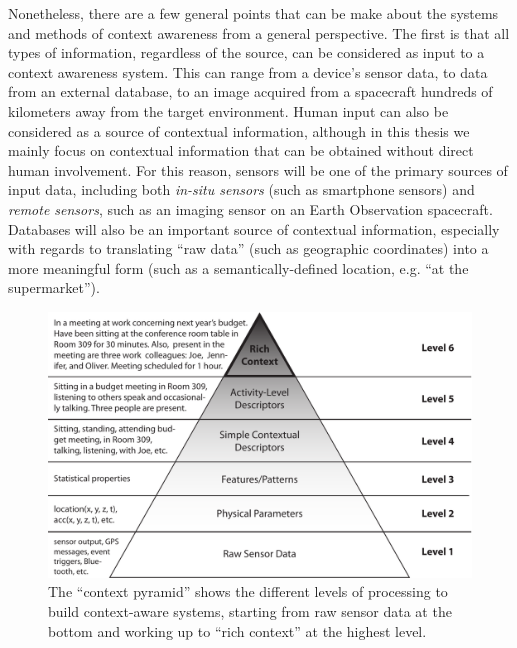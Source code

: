 Nonetheless, there are a few general points that can be make about the systems and methods of context awareness from a general perspective. The first is that all types of information, regardless of the source, can be considered as input to a context awareness system. This can range from a device's sensor data, to data from an external database, to an image acquired from a spacecraft hundreds of kilometers away from the target environment. Human input can also be considered as a source of contextual information, although in this thesis we mainly focus on contextual information that can be obtained without direct human involvement. For this reason, sensors will be one of the primary sources of input data, including both \emph{in-situ sensors} (such as smartphone sensors) and \emph{remote sensors}, such as an imaging sensor on an Earth Observation spacecraft. Databases will also be an important source of contextual information, especially with regards to translating ``raw data'' (such as geographic coordinates) into a more meaningful form (such as a semantically-defined location, e.g. ``at the supermarket'').
%
\begin{figure}[t]
  \begin{center}
    \includegraphics[width=1.0\textwidth]{Images/ContextPyramid4}
  \end{center}
  \caption[The Context Pyramid]{The ``context pyramid'' shows the different levels of processing to build context-aware systems, starting from raw sensor data at the bottom and working up to ``rich context'' at the highest level.}
  \label{fig:context_pyramid}
\end{figure}
%
